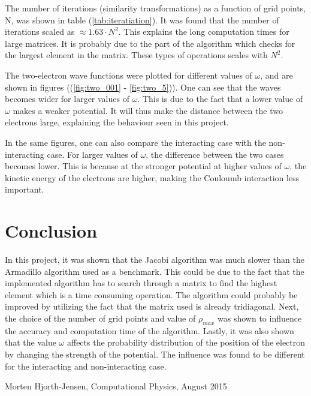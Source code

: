 \documentclass[10pt,a4paper,titlepage]{article}
\begin{document}
The number of iterations (similarity transformations) as a function of grid points, N, was shown in table (\ref{tab:iteratiation}). It was found that the number of iterations scaled as $\approx 1.63\cdot N^{2}$. This explains the long computation times for large matrices. It is probably due to the part of the algorithm which checks for the largest element in the matrix. These types of operations scales with $N^{2}$. 

The two-electron wave functions were plotted for different values of $\omega$, and are shown in figures ((\ref{fig:two_001} - \ref{fig:two_5})). One can see that the waves becomes wider for larger values of $\omega$. This is due to the fact that a lower value of $\omega$ makes a weaker potential. It will thus make the distance between the two electrons large, explaining the behaviour seen in this project. 

In the same figures, one can also compare the interacting case with the non-interacting case. For larger values of $\omega$, the difference between the two cases becomes lower. This is because at the stronger potential at higher values of $\omega$, the kinetic energy of the electrons are higher, making the Couloumb interaction less important. 



\section{Conclusion}
In this project, it was shown that the Jacobi algorithm was much slower than the Armadillo algorithm used as a benchmark. This could be due to the fact that the implemented algorithm has to search through a matrix to find the highest element which is a time consuming operation. The algorithm could probably be improved by utilizing the fact that the matrix used is already tridiagonal. Next, the choice of the number of grid points and value of $\rho_{max}$ was shown to influence the accuracy and computation time of the algorithm. Lastly, it was also shown that the value $\omega$ affects the probability distribution of the position of the electron by changing the strength of the potential. The influence was found to be different for the interacting and non-interacting case. 







\begin{flushleft}

\begin{thebibliography}{}

\singlespacing
\small




  
  Morten Hjorth-Jensen,
  Computational Physics,
  August 2015
  
\end{thebibliography}
\end{flushleft}
\end{document}
